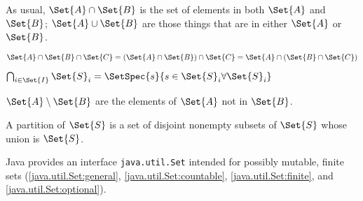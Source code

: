 As usual, $\Set{A} \cap \Set{B}$ is the set of elements in both 
$\Set{A}$ and $\Set{B}$; $\Set{A} \cup \Set{B}$ are those things
that are in either $\Set{A}$ or $\Set{B}$.

$\Set{A} \cap \Set{B} \cap \Set{C} 
= (\Set{A} \cap \Set{B}) \cap \Set{C} 
= \Set{A} \cap (\Set{B} \cap \Set{C}) $

$\bigcap_{i \in \Set{I}} \Set{S}_{i} = 
\SetSpec{ s }{ s \in \Set{S}_{i} \forall \Set{S}_{i} }$

$\Set{A} \setminus \Set{B}$ are the elements of $\Set{A}$ 
not in $\Set{B}$.

A partition of $\Set{S}$ is a set of disjoint nonempty subsets of
$\Set{S}$ whose union is $\Set{S}$.


\lstset{language=Java}

Java provides an interface \lstinline|java.util.Set| intended for
possibly mutable, finite sets (\autoref{java.util.Set:general},
 \autoref{java.util.Set:countable}, 
 \autoref{java.util.Set:finite}, 
 and
\autoref{java.util.Set:optional}).

